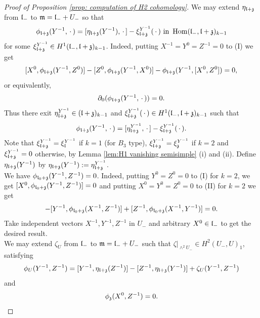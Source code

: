 \documentclass[12pt]{amsart}
\theoremstyle{plain}
\theoremstyle{definition}
\def\Hom{\operatorname{Hom}}
\begin{document}
\begin{proof} [Proof of Proposition \ref{prop: computation of H2 cohomology}]
   We may extend $\eta_{\frak l + \frak z}$ from $\frak l_-$ to $\frak m=\frak l_- + U_-$ %
   so that
  $$\phi_{\frak l+\frak z}(Y^{-1}, \,\cdot\,) = [\eta_{\frak l+\frak z }(Y^{-1}),\,\cdot\,] -\xi_{\frak l+\frak z}^{Y^{-1}}(\,\cdot\,) \text{ in }\Hom(\frak l_-, \frak l+ \frak z)_{k-1}$$
  for some $\xi_{\frak l+\frak z}^{Y^{-1}} \in H^1(\frak l_-, \frak l+\frak z)_{k-1}$.
  Indeed, putting $X^{-1} =Y^0 =Z^{-1}=0$ to (I) we get
  $$[X^0, \phi_{\frak l+ \frak z}(Y^{-1},Z^0)] - [Z^0, \phi_{\frak l + \frak z}(Y^{-1}, X^0)] - \phi_{\frak l+ \frak z}(Y^{-1}, [X^0, Z^0]) =0,$$
  or equivalently,
  \begin{eqnarray*}
  \partial_0(\phi_{\frak l+\frak z}(Y^{-1}, \,\cdot\,))=0.  %
  \end{eqnarray*}
 Thus
  there exit $\eta_{\frak l + \frak z}^{Y^{-1}} \in (\frak l + \frak z)_{k-1}$ and   $\xi_{\frak l+\frak z}^{Y^{-1}}(\,\cdot\,) \in H^1(\frak l_-, \frak l+\frak z)_{k-1}$ such that
 $$\phi_{\frak l+\frak z}(Y^{-1}, \,\cdot\,) = [\eta_{\frak l+\frak z }^{Y^{-1}},\,\cdot\,] -\xi_{\frak l+\frak z}^{Y^{-1}}(\,\cdot\,) .$$
  Note that $\xi_{\frak l+ \frak z}^{Y^{-1}} =\xi_{\frak l}^{Y^{-1}}$ if $k=1$ (for $B_3$ type), $\xi_{\frak l+ \frak z}^{Y^{-1}} =\xi_{\frak z}^{Y^{-1}}$ if $k=2$ and $\xi_{\frak l+\frak z}^{Y^{-1}}=0$ otherwise, by Lemma \ref{lem:H1 vanishing semisimple} (i) and (ii). %
Define $\eta_{\frak l + \frak z}(Y^{-1})$ by $\eta_{\frak l + \frak z}(Y^{-1}):= \eta_{\frak l+ \frak z}^{Y^{-1}}$.     \\

 We have  $\phi_{\frak l_0 + \frak z}(Y^{-1}, Z^{-1}) =0 $. Indeed,  putting $Y^0=Z^0=0$ to (I) for $k=2$, we get $[X^0, \phi_{\frak l_0 +\frak z}(Y^{-1},Z^{-1}) ]=0$ and putting $X^0=Y^0=Z^0=0$ to (II) for $k=2$ we get
  \begin{eqnarray*}
  [X^{-1}, \phi_{\frak l_0 + \frak z}(Y^{-1}, Z^{-1})] - [Y^{-1}, \phi_{\frak l_0+ \frak z}(X^{-1}, Z^{-1})] + [Z^{-1}, \phi_{\frak l_0+ \frak z}(X^{-1}, Y^{-1})] =0.
  \end{eqnarray*}
  Take independent vectors  $X^{-1}, Y^{-1}, Z^{-1}$  in $U_-$ and arbitrary $X^0\in \frak l_-$ to get the desired result. \\

   We may extend $\zeta_U$ from $\frak l_-$ to $\frak m = \frak l_-+ U_-$ such that $\zeta|_{\wedge^2U_-} \in H^2(U_-, U)_1$, satisfying
  $$\phi_U(Y^{-1}, Z^{-1}) =[Y^{-1}, \eta_{\frak l+ \frak z}(Z^{-1})] - [Z^{-1}, \eta_{\frak l + \frak z}(Y^{-1})] +\zeta_U(Y^{-1}, Z^{-1})$$
   and
   $$\phi_{\frak z}(X^0, Z^{-1})%
   = 0.$$


\end{proof}
\end{document}
